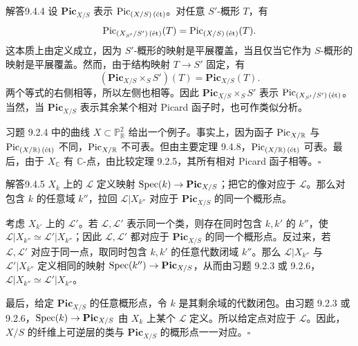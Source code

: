 \begin{origstatement}{解答}{9.4.4}\label{appA:ans944}
设 $\mathbf{Pic}_{X/S}$ 表示 $\operatorname{Pic}_{(X/S)\,(\text{ét})}$。对任意 $S'$-概形 $T$，有
\[
 \operatorname{Pic}_{(X_{S'}/S')\,(\text{ét})}(T)=\operatorname{Pic}_{(X/S)\,(\text{ét})}(T).
\]
这本质上由定义成立，因为 $S'$-概形的映射是平展覆盖，当且仅当它作为 $S$-概形的映射是平展覆盖。然而，由于结构映射 $T\to S'$ 固定，有
\[
 (\mathbf{Pic}_{X/S}\times_S S')(T)=\mathbf{Pic}_{X/S}(T).
\]
两个等式的右侧相等，所以左侧也相等。因此 $\mathbf{Pic}_{X/S}\times_S S'$ 表示 $\operatorname{Pic}_{(X_{S'}/S')\,(\text{ét})}$。当然，当 $\mathbf{Pic}_{X/S}$ 表示其余某个相对 Picard 函子时，也可作类似分析。

习题 9.2.4 中的曲线 $X\subset\mathbb P_{\mathbb R}^2$ 给出一个例子。事实上，因为函子 $\operatorname{Pic}_{X/\mathbb R}$ 与 $\operatorname{Pic}_{(X/\mathbb R)\,(\text{ét})}$ 不同，$\operatorname{Pic}_{X/\mathbb R}$ 不可表。但由主要定理 9.4.8，$\operatorname{Pic}_{(X/\mathbb R)\,(\text{ét})}$ 可表。最后，由于 $X_{\mathbb C}$ 有 $\mathbb C$-点，由比较定理 9.2.5，其所有相对 Picard 函子相等。\hfill$\square$
\end{origstatement}

\begin{origstatement}{解答}{9.4.5}\label{appA:ans945}
$X_k$ 上的 $\mathcal L$ 定义映射 $\operatorname{Spec}(k)\to\mathbf{Pic}_{X/S}$；把它的像对应于 $\mathcal L$。那么对包含 $k$ 的任意域 $k''$，拉回 $\mathcal L|X_{k''}$ 对应于 $\mathbf{Pic}_{X/S}$ 的同一个概形点。

考虑 $X_{k'}$ 上的 $\mathcal L'$。若 $\mathcal L,\mathcal L'$ 表示同一个类，则存在同时包含 $k,k'$ 的 $k''$，使 $\mathcal L|X_{k''}\simeq\mathcal L'|X_{k''}$；因此 $\mathcal L,\mathcal L'$ 都对应于 $\mathbf{Pic}_{X/S}$ 的同一个概形点。反过来，若 $\mathcal L,\mathcal L'$ 对应于同一点，取同时包含 $k,k'$ 的任意代数闭域 $k''$。那么 $\mathcal L|X_{k''}$ 与 $\mathcal L'|X_{k''}$ 定义相同的映射 $\operatorname{Spec}(k'')\to\mathbf{Pic}_{X/S}$，从而由习题 9.2.3 或 9.2.6，$\mathcal L|X_{k''}\simeq\mathcal L'|X_{k''}$。

最后，给定 $\mathbf{Pic}_{X/S}$ 的任意概形点，令 $k$ 是其剩余域的代数闭包。由习题 9.2.3 或 9.2.6，$\operatorname{Spec}(k)\to\mathbf{Pic}_{X/S}$ 由 $X_k$ 上某个 $\mathcal L$ 定义。所以给定点对应于 $\mathcal L$。因此，$X/S$ 的纤维上可逆层的类与 $\mathbf{Pic}_{X/S}$ 的概形点一一对应。\hfill$\square$
\end{origstatement}

